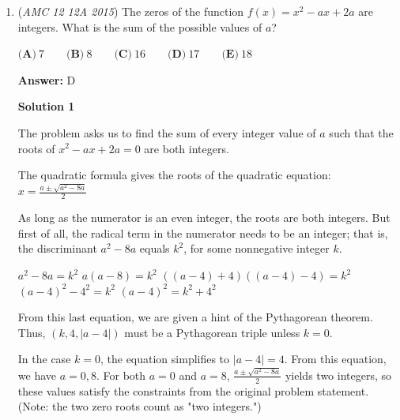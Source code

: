 \begin{enumerate}
 \textbf{Step 8: Intersection of all eight pairs}There is $\dbinom{8}{8} = 1$ choice, which forms the complete closed circle and forces all 8 people to stand.
 \[1 \times 2^0 = 1\]

 \textbf{Piecing it together:}Using the alternating signs required by PIE, the total count of distinct bad configurations is:
 \[\text{Bad Configurations} = 512 - 576 + 448 - 258 + 112 - 36 + 8 - 1 = 209\]

 Subtracting these invalid outcomes from our initial total pool yields the number of successful valid configurations:
 \[\text{Valid Configurations} = 256 - 209 = 47\]

 Thus, the probability that no two adjacent people stand up is $\boxed{\textbf{(A) } \dfrac{47}{256}}$.

 


	\item (\textit{AMC 12 12A 2015}) The zeros of the function $f(x) = x^2-ax+2a$ are integers. What is the sum of the possible values of $a$?


 $\textbf{(A)}\ 7 \qquad\textbf{(B)}\ 8 \qquad\textbf{(C)}\ 16 \qquad\textbf{(D)}\ 17 \qquad\textbf{(E)}\ 18$

 \textbf{Answer: }D



\textbf{Solution 1}

The problem asks us to find the sum of every integer value of $a$ such that the roots of $x^2 - ax + 2a = 0$ are both integers.

 The quadratic formula gives the roots of the quadratic equation: $x=\frac{a\pm\sqrt{a^2-8a}}{2}$

 As long as the numerator is an even integer, the roots are both integers. But first of all, the radical term in the numerator needs to be an integer; that is, the discriminant $a^2 - 8a$ equals $k^2$, for some nonnegative integer $k$.

 $a^2-8a=k^2$
$a(a-8)=k^2$
$((a-4)+4)((a-4)-4)=k^2$
$(a-4)^2-4^2=k^2$
$(a-4)^2=k^2+4^2$

 From this last equation, we are given a hint of the Pythagorean theorem. Thus, $(k,4,|a-4|)$ must be a Pythagorean triple unless $k = 0$.

 In the case $k=0$, the equation simplifies to $|a-4|=4$. From this equation, we have $a=0,8$. For both $a=0$ and $a=8$, $\frac{a\pm\sqrt{a^2-8a}}{2}$ yields two integers, so these values satisfy the constraints from the original problem statement. (Note: the two zero roots count as "two integers.")


\end{enumerate}
